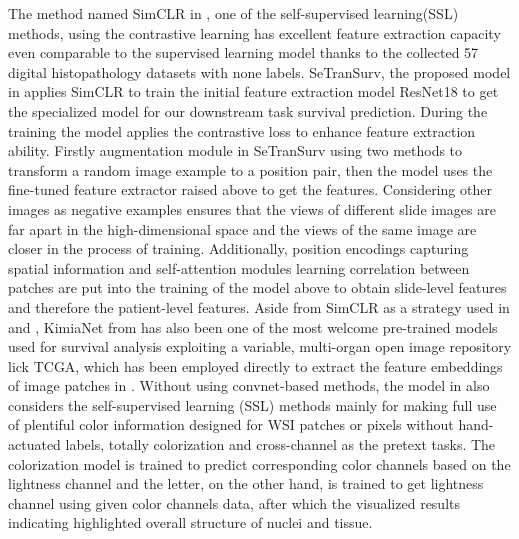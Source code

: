 \documentclass[journal,twoside,web]{ieeecolor}
\begin{document}
The method named SimCLR in \cite{ciga2022self}, one of the self-supervised learning(SSL) methods, using the contrastive learning has excellent feature extraction capacity even comparable to the supervised learning model thanks to the collected 57 digital histopathology datasets with none labels.
SeTranSurv, the proposed model in \cite{huang2021integration} applies SimCLR to train the initial feature extraction model ResNet18\cite{he2016deep} to get the specialized model for our downstream task survival prediction.
During the training the model applies the contrastive loss\cite{he2020momentum} to enhance feature extraction ability.
Firstly augmentation module in SeTranSurv using two methods to transform a random image example to a position pair, then the model uses the fine-tuned feature extractor raised above to get the features. 
Considering other images as negative examples ensures that the views of different slide images are far apart in the high-dimensional space and the views of the same image are closer in the process of training.
Additionally, position encodings capturing spatial information and self-attention modules learning correlation between patches are put into the training of the model above to obtain slide-level features and therefore the patient-level features.
Aside from SimCLR as a strategy used in \cite{benkirane2022hyper} and \cite{li2021dual}, KimiaNet from \cite{riasatian2021fine} has also been one of the most welcome pre-trained models used for survival analysis exploiting a variable, multi-organ open image repository lick TCGA, which has been employed directly to extract the feature embeddings of image patches in \cite{guo2023higt} \cite{li2021dual}.
Without using convnet-based methods, the model in \cite{fan2022cancer} also considers the self-supervised learning (SSL) methods mainly for making full use of plentiful color information designed for WSI patches or pixels without hand-actuated labels, totally colorization and cross-channel as the pretext tasks.
The colorization model is trained to predict corresponding color channels based on the lightness channel and the letter, on the other hand, is trained to get lightness channel using given color channels data, after which the visualized results indicating highlighted overall structure of nuclei and tissue.
\end{document}
